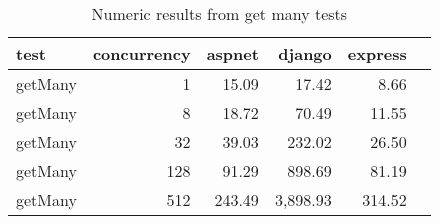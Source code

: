 \FloatBarrier
\begin{table}[!htp]\centering
    \caption{Numeric results from get many tests}\label{tab:resultsGetMany}
    \scriptsize
    \begin{tabular}{lrrrrr}\toprule
        test    & concurrency & aspnet & django   & express \\\midrule
        getMany & 1           & 15.09  & 17.42    & 8.66    \\
        getMany & 8           & 18.72  & 70.49    & 11.55   \\
        getMany & 32          & 39.03  & 232.02   & 26.50   \\
        getMany & 128         & 91.29  & 898.69   & 81.19   \\
        getMany & 512         & 243.49 & 3,898.93 & 314.52  \\
        \bottomrule
    \end{tabular}
\end{table}
\FloatBarrier
